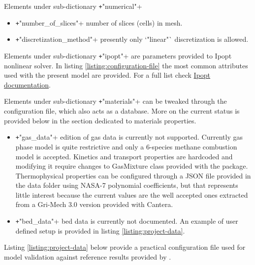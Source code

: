\documentclass[11pt]{paper}
\begin{document}
\noindent{}Elements under sub-dictionary \texttt+"numerical"+

\begin{itemize}
	\item \texttt+"number_of_slices"+
	number of slices (cells) in mesh.

	\item \texttt+"discretization_method"+
	presently only `"linear"` discretization is allowed.
\end{itemize}

\noindent{}Elements under sub-dictionary \texttt+"ipopt"+ are parameters provided to Ipopt nonlinear solver. In listing \ref{listing:configuration-file} the most common attributes used with the present model are provided. For a full list check \href{https://coin-or.github.io/Ipopt/OPTIONS.html}{Ipopt documentation}.

\noindent{}Elements under sub-dictionary \texttt+"materials"+ can be tweaked through the configuration file, which also acts as a database. More on the current status is provided below in the section dedicated to materials properties.

\begin{itemize}
	\item \texttt+"gas_data"+
	edition of gas data is currently not supported. Currently gas phase model is quite restrictive and only a 6-species methane combustion model is accepted. Kinetics and transport properties are hardcoded and modifying it require changes to GasMixture class provided with the package. Thermophysical properties can be configured through a JSON file provided in the data folder using NASA-7 polynomial coefficients, but that represents little interest because the current values are the well accepted ones extracted from a Gri-Mech 3.0 version provided with Cantera.
	
	\item \texttt+"bed_data"+
	bed data is currently not documented. An example of user defined setup is provided in listing \ref{listing:project-data}.
\end{itemize}

Listing \ref{listing:project-data} below provide a practical configuration file used for model validation against reference results provided by \textcite{Hanein2017}.

\inputminted{json}{../sample/minified-for-dist/case-hanein-paper/simulate.json}
\end{document}
